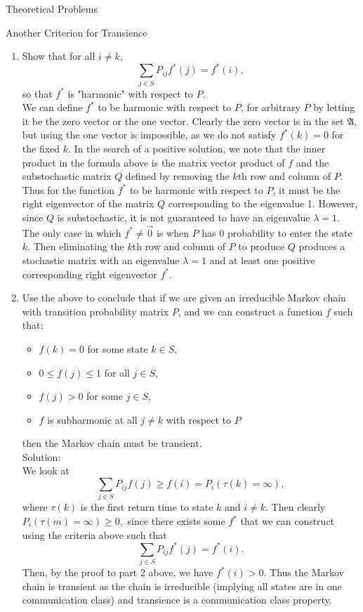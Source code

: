 \documentclass[12pt]{article}
\numberwithin{equation}{section}
\begin{document}
\begin{section}{Theoretical Problems}
\begin{subsection}{Another Criterion for Transience}
\begin{enumerate}
\begin{itemize}
    \end{itemize}

\item Show that for all $i\neq k$,
$$\sum_{j\in S}P_{ij}f^*(j)=f^*(i),$$
so that $f^*$ is "harmonic" with respect to $P$.\\

We can define $f^*$ to be harmonic with respect to $P$, for arbitrary $P$ by letting it be the zero vector or the one vector. Clearly the zero vector is in the set $\mathfrak{A}$, but using the one vector is impossible, as we do not satisfy $f^*(k)=0$ for the fixed $k$. In the search of a positive solution, we note that the inner product in the formula above is the matrix vector product of $f$ and the substochastic matrix $Q$ defined by removing the $k$th row and column of $P$. Thus for the function $f^*$ to be harmonic with respect to $P$, it must be the right eigenvector of the matrix $Q$ corresponding to the eigenvalue 1. However, since $Q$ is substochastic, it is not guaranteed to have an eigenvalue $\lambda=1$. The only case in which $f^*\neq\vec{0}$ is when $P$ has 0 probability to enter the state $k$. Then eliminating the $k$th row and column of $P$ to produce $Q$ produces a stochastic matrix with an eigenvalue $\lambda=1$ and at least one positive corresponding right eigenvector $f^*$.


\item Use the above to conclude that if we are given an irreducible Markov chain with transition probability matrix $P$, and we can construct a function $f$ such that:
    \begin{itemize}
    \item $f(k)=0$ for some state $k\in S$,
    \item $0\leq f(j)\leq 1$ for all $j\in S$,
    \item $f(j)>0$ for some $j\in S$,
    \item $f$ is subharmonic at all $j\neq k$ with respect to $P$
    \end{itemize}
    then the Markov chain must be transient.\\

    Solution:\\

    We look at
    $$\sum_{j\in S}P_{ij}f(j)\geq f(i)=P_i(\tau(k)=\infty),$$
    where $\tau(k)$ is the first return time to state $k$ and $i\neq k$. Then clearly $P_i(\tau(m)=\infty)\geq 0,$ since there exists some $f^*$ that we can construct using the criteria above such that
     $$\sum_{j\in S}P_{ij}f^*(j)=f^*(i).$$
     Then, by the proof to part 2 above, we  have $f^*(i)>0$.
       Thus the Markov chain is transient as the chain is irreducible (implying all states are in one communication class) and transience is a communication class property.

    \end{enumerate}
\end{subsection}
\end{section}
\end{document}
